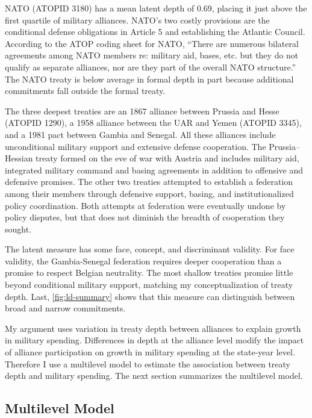 \documentclass[12pt]{article}
\begin{document}
NATO (ATOPID 3180) has a mean latent depth of 0.69, placing it just above the first quartile of military alliances. 
NATO's two costly provisions are the conditional defense obligations in Article 5 and establishing the Atlantic Council. 
According to the ATOP coding sheet for NATO, ``There are numerous bilateral agreements among NATO members re: military aid, bases, etc. but they do not qualify as separate alliances, nor are they part of the overall NATO structure.''
The NATO treaty is below average in formal depth in part because additional commitments fall outside the formal treaty.    


The three deepest treaties are an 1867 alliance between Prussia and Hesse (ATOPID 1290), a 1958 alliance between the UAR and Yemen (ATOPID 3345), and a 1981 pact between Gambia and Senegal. 
All these alliances include unconditional military support and extensive defense cooperation. 
The Prussia--Hessian treaty formed on the eve of war with Austria and includes military aid, integrated military command and basing agreements in addition to offensive and defensive promises. 
The other two treaties attempted to establish a federation among their members through defensive support, basing, and institutionalized policy coordination. 
Both attempts at federation were eventually undone by policy disputes, but that does not diminish the breadth of cooperation they sought. 


The latent measure has some face, concept, and discriminant validity. 
For face validity, the Gambia-Senegal federation requires deeper cooperation than a promise to respect Belgian neutrality. 
The most shallow treaties promise little beyond conditional military support, matching my conceptualization of treaty depth. 
Last, \autoref{fig:ld-summary} shows that this measure can distinguish between broad and narrow commitments. 


My argument uses variation in treaty depth between alliances to explain growth in military spending.
Differences in depth at the alliance level modify the impact of alliance participation on growth in military spending at the state-year level. 
Therefore I use a multilevel model to estimate the association between treaty depth and military spending.  
The next section summarizes the multilevel model. 


\subsection{Multilevel Model} 
\end{document}
